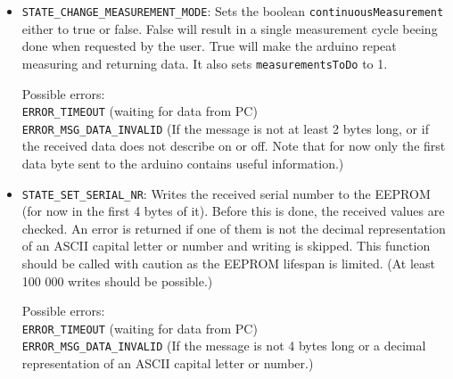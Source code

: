 \documentclass[11pt,a4paper,english]{article}
\begin{document}
\begin{itemize}
\item \texttt{STATE\_CHANGE\_MEASUREMENT\_MODE}: Sets the boolean \texttt{continuousMeasurement} either to true or false. False will result in a single measurement cycle beeing done when requested by the user. True will make the arduino repeat measuring and returning data. It also sets \texttt{measurementsToDo} to 1.

	Possible errors:\\\texttt{ERROR\_TIMEOUT} (waiting for data from PC)\\\texttt{ERROR\_MSG\_DATA\_INVALID} (If the message is not at least 2 bytes long, or if the received data does not describe on or off. Note that for now only the first data byte sent to the arduino contains useful information.)

\item \texttt{STATE\_SET\_SERIAL\_NR}: Writes the received serial number to the EEPROM (for now in the first 4 bytes of it). Before this is done, the received values are checked. An error is returned if one of them is not the decimal representation of an ASCII capital letter or number and writing is skipped. This function should be called with caution as the EEPROM lifespan is limited. (At least 100 000 writes should be possible.)

	Possible errors:\\\texttt{ERROR\_TIMEOUT} (waiting for data from PC)\\\texttt{ERROR\_MSG\_DATA\_INVALID} (If the message is not 4 bytes long or a decimal representation of an ASCII capital letter or number.)

\end{itemize}
\end{document}
